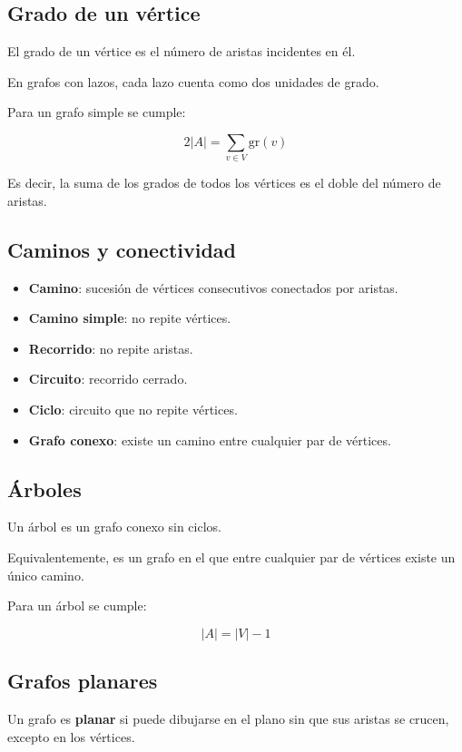 \documentclass[12pt]{article}
\theoremstyle{plain}
\theoremstyle{definition}
\theoremstyle{remark}
\begin{document}
\subsection*{Grado de un vértice}

El grado de un vértice es el número de aristas incidentes en él.

En grafos con lazos, cada lazo cuenta como dos unidades de grado.

Para un grafo simple se cumple:

\[
2|A| = \sum_{v \in V} \mathrm{gr}(v)
\]

Es decir, la suma de los grados de todos los vértices es el doble del número de aristas.

\subsection*{Caminos y conectividad}

\begin{itemize}
    \item \textbf{Camino}: sucesión de vértices consecutivos conectados por aristas.
    \item \textbf{Camino simple}: no repite vértices.
    \item \textbf{Recorrido}: no repite aristas.
    \item \textbf{Circuito}: recorrido cerrado.
    \item \textbf{Ciclo}: circuito que no repite vértices.
    \item \textbf{Grafo conexo}: existe un camino entre cualquier par de vértices.
\end{itemize}

\subsection*{Árboles}

Un árbol es un grafo conexo sin ciclos.

Equivalentemente, es un grafo en el que entre cualquier par de vértices existe un único camino.

Para un árbol se cumple:

\[
|A| = |V| - 1
\]

\subsection*{Grafos planares}

Un grafo es \textbf{planar} si puede dibujarse en el plano sin que sus aristas se crucen, excepto en los vértices.
\end{document}
